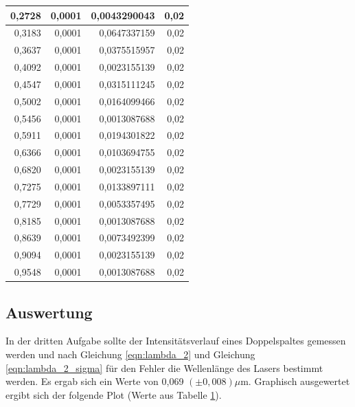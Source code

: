 \documentclass[12pt]{scrartcl}
\begin{document}
\begin{table}[H]
\begin{center}
\begin{tabular}{|r|r|r|r|}
0,2728 & 0,0001 & 0,0043290043 & 0,02 \\ \hline
0,3183 & 0,0001 & 0,0647337159 & 0,02 \\ \hline
0,3637 & 0,0001 & 0,0375515957 & 0,02 \\ \hline
0,4092 & 0,0001 & 0,0023155139 & 0,02 \\ \hline
0,4547 & 0,0001 & 0,0315111245 & 0,02 \\ \hline
0,5002 & 0,0001 & 0,0164099466 & 0,02 \\ \hline
0,5456 & 0,0001 & 0,0013087688 & 0,02 \\ \hline
0,5911 & 0,0001 & 0,0194301822 & 0,02 \\ \hline
0,6366 & 0,0001 & 0,0103694755 & 0,02 \\ \hline
0,6820 & 0,0001 & 0,0023155139 & 0,02 \\ \hline
0,7275 & 0,0001 & 0,0133897111 & 0,02 \\ \hline
0,7729 & 0,0001 & 0,0053357495 & 0,02 \\ \hline
0,8185 & 0,0001 & 0,0013087688 & 0,02 \\ \hline
0,8639 & 0,0001 & 0,0073492399 & 0,02 \\ \hline
0,9094 & 0,0001 & 0,0023155139 & 0,02 \\ \hline
0,9548 & 0,0001 & 0,0013087688 & 0,02 \\ \hline
\end{tabular}
\end{center}
\label{tab:a_3_m}
\end{table}


\subsection{Auswertung}
In der dritten Aufgabe sollte der Intensitätsverlauf eines Doppelspaltes gemessen werden und nach Gleichung \ref{eqn:lambda_2} und Gleichung \ref{eqn:lambda_2_sigma} für den Fehler die Wellenlänge des Lasers bestimmt werden. Es ergab sich ein Werte von 0,069 $(\pm 0,008) \mu$m.
Graphisch ausgewertet ergibt sich der folgende Plot (Werte aus Tabelle \ref{tab:a_3_m}).
\end{document}
